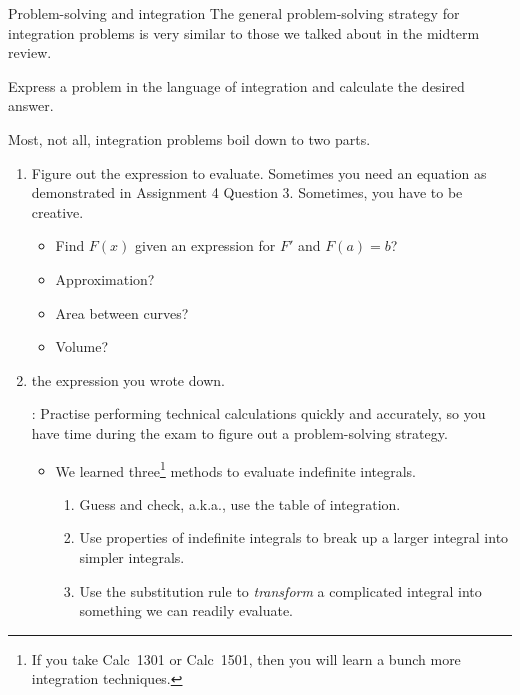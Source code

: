 \documentclass[../main.tex]{subfiles}
\begin{document}
\begin{lesson}{Problem-solving and integration}
  The general problem-solving strategy for integration problems is very similar to those we talked about in the midterm review.

  \begin{mdframed}[style=simple]
    Express a problem in the language of integration and calculate the desired answer. 
  \end{mdframed}

  Most, not all, integration problems boil down to two parts.
  \begin{enumerate}[wide, label=\textbf{Part~\arabic*}.]
    \item Figure out the  expression to evaluate. Sometimes you need an equation as demonstrated in Assignment 4 Question 3. Sometimes, you have to be creative.

      \begin{itemize}[wide]
        \item Find \(F(x)\) given an expression for \(F'\) and \(F(a) = b\)?

        \item Approximation?  

        \item Area between curves?  

        \item Volume?  

      \end{itemize}

    \item {} the expression you wrote down. 

      : Practise performing technical calculations quickly and accurately, so you have time during the exam to figure out a problem-solving strategy.

      \begin{itemize}
        \item We learned three\footnote{If you take Calc~1301 or Calc~1501, then you will learn a bunch more integration techniques.} methods to evaluate indefinite integrals.

          \begin{enumerate}
            \item Guess and check, a.k.a., use the table of integration. 
            \item Use properties of indefinite integrals to break up a larger integral into simpler integrals. 
            \item Use the substitution rule to \emph{transform} a complicated integral into something we can readily evaluate.
          \end{enumerate}


\end{itemize}
\end{enumerate}
\end{lesson}
\end{document}
